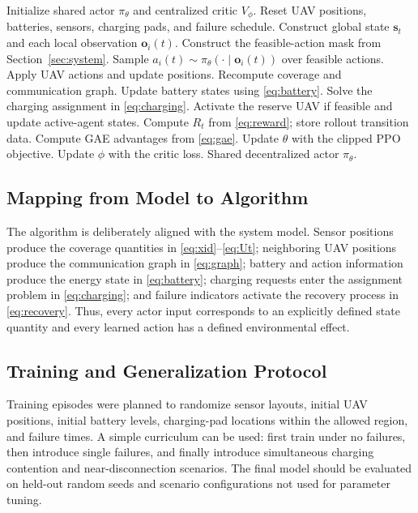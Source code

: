 \documentclass[conference]{IEEEtran}
\begin{document}
\begin{algorithm}[t]
\caption{MAPPO training algorithm}
\label{alg:training}
\begin{algorithmic}[1]
\STATE Initialize shared actor $\pi_\theta$ and centralized critic $V_\phi$.
    \STATE Reset UAV positions, batteries, sensors, charging pads, and failure schedule.
        \STATE Construct global state $\mathbf s_t$ and each local observation $\mathbf o_i(t)$.
            \STATE Construct the feasible-action mask from Section~\ref{sec:system}.
            \STATE Sample $a_i(t)\sim\pi_\theta(\cdot\mid\mathbf o_i(t))$ over feasible actions.
        \ENDFOR
        \STATE Apply UAV actions and update positions.
        \STATE Recompute coverage and communication graph.
        \STATE Update battery states using \eqref{eq:battery}.
            \STATE Solve the charging assignment in \eqref{eq:charging}.
        \ENDIF
            \STATE Activate the reserve UAV if feasible and update active-agent states.
        \ENDIF
        \STATE Compute $R_t$ from \eqref{eq:reward}; store rollout transition data.
    \ENDFOR
    \STATE Compute GAE advantages from \eqref{eq:gae}.
    \STATE Update $\theta$ with the clipped PPO objective.
    \STATE Update $\phi$ with the critic loss.
\ENDFOR
\RETURN Shared decentralized actor $\pi_\theta$.
\end{algorithmic}
\end{algorithm}

\subsection{Mapping from Model to Algorithm}
The algorithm is deliberately aligned with the system model. Sensor positions produce the coverage quantities in \eqref{eq:xid}--\eqref{eq:Ut}; neighboring UAV positions produce the communication graph in \eqref{eq:graph}; battery and action information produce the energy state in \eqref{eq:battery}; charging requests enter the assignment problem in \eqref{eq:charging}; and failure indicators activate the recovery process in \eqref{eq:recovery}. Thus, every actor input corresponds to an explicitly defined state quantity and every learned action has a defined environmental effect.

\subsection{Training and Generalization Protocol}
Training episodes were planned to randomize sensor layouts, initial UAV positions, initial battery levels, charging-pad locations within the allowed region, and failure times. A simple curriculum can be used: first train under no failures, then introduce single failures, and finally introduce simultaneous charging contention and near-disconnection scenarios. The final model should be evaluated on held-out random seeds and scenario configurations not used for parameter tuning.
\end{document}
